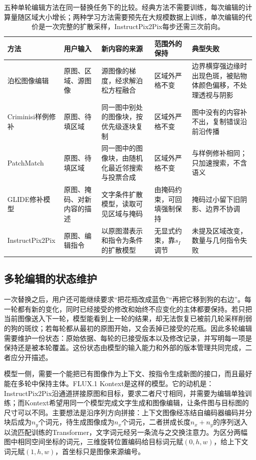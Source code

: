 \begin{table}[tbp]
 \centering
 \small
 \begin{tabularx}{\linewidth}{@{}p{26mm}p{30mm}XXX@{}}
  \toprule
  方法 & 用户输入 & 新内容的来源 & 范围外的保持 & 典型失败\\
  \midrule
  泊松图像编辑 & 原图、区域、源图像 & 源图像的梯度，经求解泊松方程融合 & 区域外严格不变 & 边界横穿强边缘时出现色斑，被贴物体颜色偏移，不处理透视与阴影\\
  Criminisi样例修补 & 原图、待填区域 & 同一图中别处的图像块，按优先级逐块复制 & 区域外严格不变 & 图中没有的内容补不出，复制错误沿前沿传播\\
  PatchMatch & 原图、待填区域 & 同一图中的图像块，由随机化最近邻搜索与投票合成 & 区域外严格不变 & 与样例修补相同；只加速搜索，不含语义\\
  GLIDE修补模型 & 原图、掩码、对新内容的描述 & 文字条件扩散模型，读取可见区域与掩码 & 由掩码约束，可回填强制保持 & 掩码过小留下旧阴影、边界不协调\\
  InstructPix2Pix & 原图、编辑指令 & 以原图潜表示和指令为条件的扩散模型 & 无显式约束，靠$s_I$调节 & 未提及区域改变，数量与几何指令失败\\
  \bottomrule
 \end{tabularx}
 \caption{五种单轮编辑方法在同一替换任务下的比较。经典方法不需要训练，每次编辑的计算量随区域大小增长；两种学习方法需要预先在大规模数据上训练，单次编辑的代价是一次完整的扩散采样，InstructPix2Pix每步还需三次前向。}
 \label{tab:vision-generation-editing-comparison}
\end{table}

\subsection{多轮编辑的状态维护}
\label{sec:vision-generation-kontext-history}

一次替换之后，用户还可能继续要求“把花瓶改成蓝色”“再把它移到狗的右边”。每一轮都有新的变化，同时已经接受的修改和始终不应变化的主体都要保持。若只把当前图像送入下一轮，模型能看到上一轮的结果，却无法恢复已被前几轮采样削弱的狗的斑纹；若每轮都从最初的原图开始，又会丢掉已接受的花瓶。因此多轮编辑需要维护一份状态：原始依据、每轮的已接受版本以及修改记录，并写明每一项是保持还是被本轮覆盖。这份状态由模型的输入能力和外部的版本管理共同完成，二者应分开描述。

模型一侧，需要一个能把已有图像作为上下文、按指令生成新图的接口，而且最好能在多轮中保持主体。FLUX.1 Kontext是这样的模型。它的动机是：InstructPix2Pix沿通道拼接原图和目标，要求二者尺寸相同，并需要为编辑单独训练；而Kontext希望用同一个模型完成文字生成和图像编辑，让条件图与目标图的尺寸可以不同。主要想法是沿序列方向拼接：上下文图像经冻结自编码器编码并分块后成为$n_y$个词元，待生成图像成为$n_x$个词元，二者拼成长度$n_x+n_y$的序列送入以流匹配训练的Transformer，文字词元经另一条流与之交换注意力。为区分两幅图中相同空间坐标的词元，三维旋转位置编码给目标词元赋$(0,h,w)$，给上下文词元赋$(1,h,w)$，首坐标只是图像来源编号。

